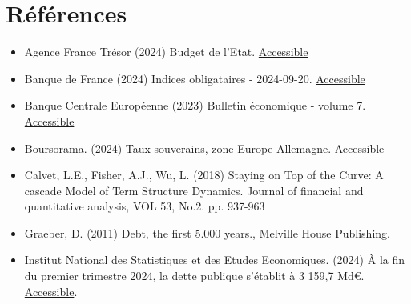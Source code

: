 \documentclass[a4paper]{article}
\begin{document}
\section{Références}
\begin{itemize}

\item Agence France Trésor (2024) Budget de l’Etat. \href{https://www.aft.gouv.fr/fr/budget-etat. }{Accessible}

\item Banque de France (2024) Indices obligataires - 2024-09-20. \href{https://www.banque-france.fr/fr/statistiques/taux-et-cours/indices-obligataires-2024-09-20}{Accessible}

\item Banque Centrale Européenne (2023) Bulletin économique - volume 7. \href{https://www.ecb.europa.eu/press/economic-bulletin/focus/2023/html/ecb.ebbox202307_02~78906aa989.en.html }{Accessible}

\item Boursorama. (2024) Taux souverains, zone Europe-Allemagne. \href{ https://www.boursorama.com/bourse/taux/souverains/?area_filter%5Bcountries%5D=DEU }{Accessible}

\item Calvet, L.E., Fisher, A.J., Wu, L. (2018) Staying on Top of the Curve: A cascade Model of Term Structure Dynamics. Journal of financial and quantitative analysis, VOL 53, No.2. pp. 937-963

\item Graeber, D. (2011) Debt, the first 5.000 years., Melville House Publishing.

\item Institut National des Statistiques et des Etudes Economiques. (2024) À la fin du premier trimestre 2024, la dette publique s’établit à 3 159,7 Md€. \href{https://www.insee.fr/fr/statistiques/8210074}{Accessible}.


\end{itemize}
\end{document}
